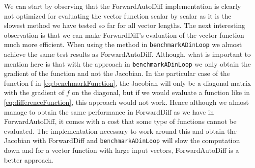 We can start by observing that the ForwardAutoDiff implementation is clearly not optimized for evaluating the vector function scalar by scalar as it is the slowest method we have tested so far for all vector lengths. The next interesting observation is that we can make ForwardDiff's evaluation of the vector function much more efficient. When using the method in \texttt{benchmarkADinLoop} we almost achieve the same test results as ForwardAutoDiff. Although, what is important to mention here is that with the approach in \texttt{benchmarkADinLoop} we only obtain the gradient of the function and not the Jacobian. In the particular case of the function f in \eqref{eq:benchmarkFunction}, the Jacobian will only be a diagonal matrix with the gradient of $f$ on the diagonal, but if we would evaluate a function like in \eqref{eq:differenceFunction}, this approach would not work. Hence although we almost manage to obtain the same performance in ForwardDiff as we have in ForwardAutoDiff, it comes with a cost that some type of functions cannot be evaluated. The implementation necessary to work around this and obtain the Jacobian with ForwardDiff and \texttt{benchmarkADinLoop} will slow the computation down and for a vector function with large input vectors, ForwardAutoDiff is a better approach. 

